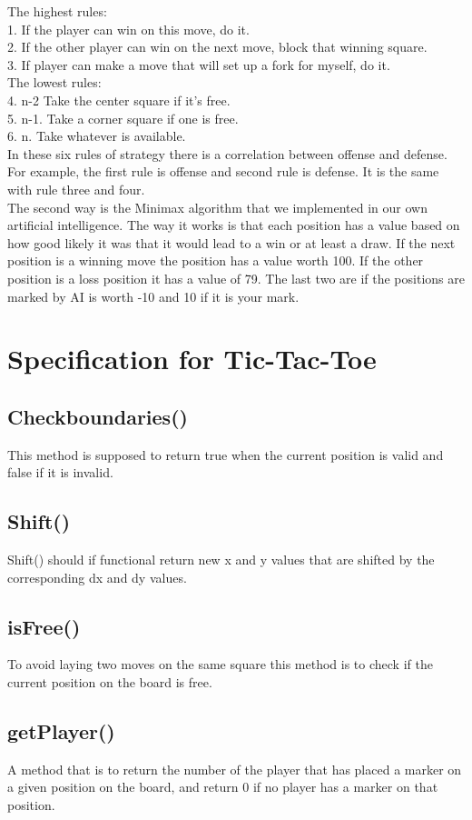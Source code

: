 \documentclass[a4paper,10pt]{article}
\begin{document}
The highest rules:\\
1. If the player can win on this move, do it. \\
2. If the other player can win on the next move, block that winning square.\\
3. If player can make a move that will set up a fork for myself, do it.\\
The lowest rules:\\
4. n-2 Take the center square if it’s free.\\
5. n-1. Take a corner square if one is free. \\
6. n. Take whatever is available.\\
In these six rules of strategy there is a correlation between offense and defense. For example, the first rule is offense and second rule is defense. It is the same with rule three and four. \\
The second way is the Minimax algorithm that we implemented in our own artificial intelligence. The way it works is that each position has a value based on how good likely it was that it would lead to a win or at least a draw. If the next position is a winning move the position has a value worth 100. If the other position is a loss position it has a value of 79. The last two are if the positions are marked by AI is worth -10 and 10 if it is your mark. \\

	
	\section{Specification for Tic-Tac-Toe} 
\subsection{Checkboundaries()}
		This method is supposed to return true when the current position is valid and false if it is invalid.
\subsection{Shift()}
Shift() should if functional return new x and y values that are shifted by the corresponding dx and dy values.
\subsection{isFree()}
To avoid laying two moves on the same square this method is to check if the current position on the board is free.
\subsection{getPlayer()}
A method that is to return the number of the player that has placed a marker on a given position on the board, and return 0 if no player has a marker on that position.
\end{document}
